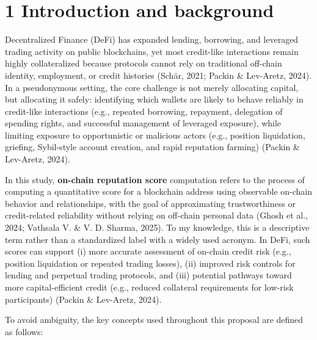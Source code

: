 \clearpage
{}
\section*{1 \textbf{Introduction and background}}
\label{sec:introduction-and-background}

Decentralized Finance (DeFi) has expanded lending, borrowing, and leveraged trading activity on public blockchains, yet most credit-like interactions remain highly collateralized because protocols cannot rely on traditional off-chain identity, employment, or credit histories (Sch\"{a}r, 2021; Packin \& Lev-Aretz, 2024). In a pseudonymous setting, the core challenge is not merely allocating capital, but allocating it safely: identifying which wallets are likely to behave reliably in credit-like interactions (e.g., repeated borrowing, repayment, delegation of spending rights, and successful management of leveraged exposure), while limiting exposure to opportunistic or malicious actors (e.g., position liquidation, griefing, Sybil-style account creation, and rapid reputation farming) (Packin \& Lev-Aretz, 2024).


In this study, \textbf{on-chain reputation score} computation refers to the process of computing a quantitative score for a blockchain address using observable on-chain behavior and relationships, with the goal of approximating trustworthiness or credit-related reliability without relying on off-chain personal data (Ghosh et al., 2024; Vathsala V. \& V. D. Sharma, 2025). To my knowledge, this is a descriptive term rather than a standardized label with a widely used acronym. In DeFi, such scores can support (i) more accurate assessment of on-chain credit risk (e.g., position liquidation or repeated trading losses), (ii) improved risk controls for lending and perpetual trading protocols, and (iii) potential pathways toward more capital-efficient credit (e.g., reduced collateral requirements for low-risk participants) (Packin \& Lev-Aretz, 2024).


To avoid ambiguity, the key concepts used throughout this proposal are defined as follows:


